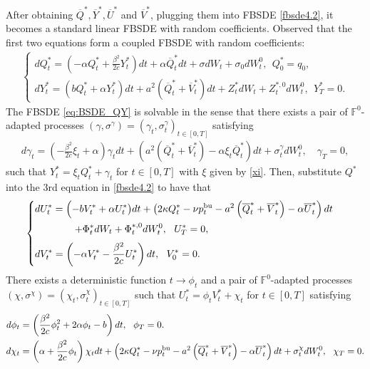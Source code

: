 \documentclass[11pt]{article}
\numberwithin{equation}{section}
\begin{document}
After obtaining $\overline{Q}^*, \overline{Y}^*, \overline{U}^*$ and $\overline{V}^*$, plugging them into FBSDE \eqref{fbsde4.2}, it becomes a standard linear FBSDE with random coefficients. Observed that the first two equations form a coupled FBSDE with random coefficients: 
\begin{align}\label{eq:BSDE_QY}
\begin{cases}
\displaystyle dQ_t^*=\left(-\alpha Q_t^*+\frac{\beta^2}{2c}Y_t^*\right)dt+\alpha\overline{Q}_t^*dt+\sigma dW_t+\sigma_0dW_t^0,~~Q_0^*=q_0,\\[0.6em]
\displaystyle dY_t^*=\left(bQ_t^*+\alpha Y_t^*\right)dt+a^2\left(\overline{Q}_t^*+\overline{V}_t^*\right)dt+Z_t^*dW_t+Z_t^{*,0}dW_t^0, ~~ Y_T^*=0.
\end{cases}
\end{align}
The FBSDE \eqref{eq:BSDE_QY} is solvable in the sense that there exists a pair of $\mathbb{F}^0$-adapted processes $(\gamma, \sigma^{\gamma})=(\gamma_t, \sigma_t^{\gamma})_{t\in[0,T]}$ satisfying 
\begin{align}\label{gamma}
d\gamma_t=\left(-\frac{\beta^2}{2c}\xi_t+\alpha\right)\gamma_tdt+\left(a^2(\overline{Q}_t^*+\overline{V}_t^*)-\alpha \xi_t\overline{Q}_t^*\right)dt+\sigma_t^{\gamma}dW_t^0, \quad \gamma_T=0,
\end{align}
such that $Y_t^*=\xi_tQ_t^*+\gamma_t$ for $t\in[0,T]$ with $\xi$ given by \eqref{xi}.  Then, substitute $Q^*$ into the 3rd equation in \eqref{fbsde4.2} to have that
    \begin{align}
    	\begin{cases}
    		\displaystyle dU_t^*=\left(-bV_t^*+\alpha U_t^*\big)dt+\big(2\kappa Q_t^*-\nu p_t^{{\rm bu}}-a^2\left(\overline{Q}_t^*+\overline{V}_t^*\right)-\alpha \overline{U}_t^*\right)dt\\[0.6em]
            \displaystyle\qquad\qquad+\Phi_t^* dW_t+\Phi_t^{*, 0}dW_t^0,~~U_T^*=0,\\[0.6em]
    		\displaystyle dV_t^*=\left(-\alpha V_t^*-\frac{\beta^2}{2c}U_t^*\right)dt,~~V_0^*=0.
    	\end{cases}
    \end{align}
    There exists a deterministic function $t\to\phi_t$ and a pair of $\mathbb{F}^0$-adapted processes $(\chi,\sigma^{\chi})=(\chi_t, \sigma_t^{\chi})_{t\in [0,T]}$ such that $U_t^*=\phi_tV_t^*+\chi_t$ for $t\in [0, T]$ satisfying
    \begin{align}
    	d\phi_t&=\left(\frac{\beta^2}{2c} \phi_t^2+2\alpha\phi_t-b\right)dt,~~\phi_T=0.\label{phi}\\ d\chi_t&=\left(\alpha+\frac{\beta^2}{2c}\phi_t\right)\chi_tdt+\left(2\kappa Q_t^*-\nu p_t^{{\rm bu}}-a^2\left(\overline{Q}_t^*+\overline{V}_t^*\right)-\alpha \overline{U}_t^*\right)dt+\sigma_t^{\chi}dW_t^0, ~~ \chi_T=0.\label{phi2}
    \end{align}
\end{document}
